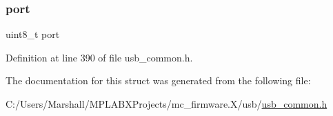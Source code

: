\subsubsection{\texorpdfstring{port}{port}}
{\footnotesize\ttfamily uint8\+\_\+t port}



Definition at line 390 of file usb\+\_\+common.\+h.



The documentation for this struct was generated from the following file\+:\begin{DoxyCompactItemize}
\item 
C\+:/\+Users/\+Marshall/\+M\+P\+L\+A\+B\+X\+Projects/mc\+\_\+firmware.\+X/usb/\mbox{\hyperlink{usb__common_8h}{usb\+\_\+common.\+h}}\end{DoxyCompactItemize}

